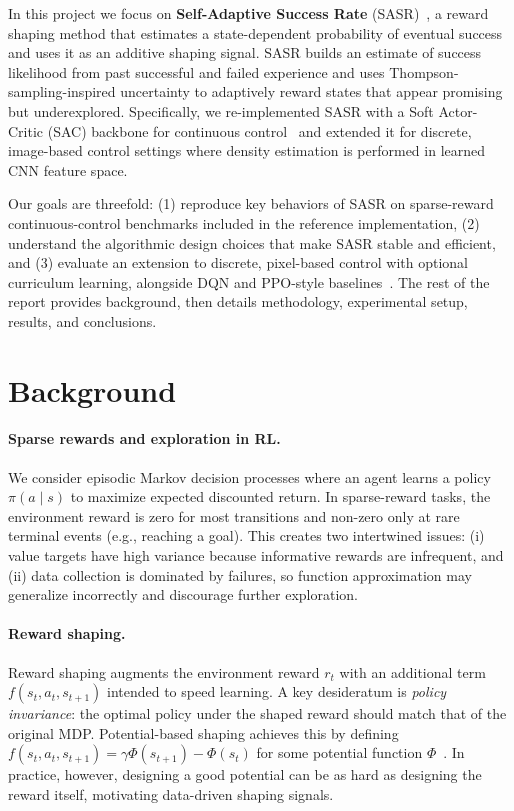 \documentclass{article}
\begin{document}
In this project we focus on \textbf{Self-Adaptive Success Rate} (SASR)~\citep{ma2025sasr}, a reward shaping method that estimates a state-dependent probability of eventual success and uses it as an additive shaping signal. SASR builds an estimate of success likelihood from past successful and failed experience and uses Thompson-sampling-inspired uncertainty to adaptively reward states that appear promising but underexplored. Specifically, we re-implemented SASR with a Soft Actor-Critic (SAC) backbone for continuous control~\citep{haarnoja2018sac} and extended it for discrete, image-based control settings where density estimation is performed in learned CNN feature space.

Our goals are threefold: (1) reproduce key behaviors of SASR on sparse-reward continuous-control benchmarks included in the reference implementation, (2) understand the algorithmic design choices that make SASR stable and efficient, and (3) evaluate an extension to discrete, pixel-based control with optional curriculum learning, alongside DQN and PPO-style baselines~\citep{mnih2015dqn}. The rest of the report provides background, then details methodology, experimental setup, results, and conclusions.

\section{Background}
\label{sec:background}

\paragraph{Sparse rewards and exploration in RL.}
We consider episodic Markov decision processes where an agent learns a policy \(\pi(a \mid s)\) to maximize expected discounted return. In sparse-reward tasks, the environment reward is zero for most transitions and non-zero only at rare terminal events (e.g., reaching a goal). This creates two intertwined issues: (i) value targets have high variance because informative rewards are infrequent, and (ii) data collection is dominated by failures, so function approximation may generalize incorrectly and discourage further exploration.

\paragraph{Reward shaping.}
Reward shaping augments the environment reward \(r_t\) with an additional term \(f(s_t, a_t, s_{t+1})\) intended to speed learning. A key desideratum is \emph{policy invariance}: the optimal policy under the shaped reward should match that of the original MDP. Potential-based shaping achieves this by defining \(f(s_t, a_t, s_{t+1}) = \gamma \Phi(s_{t+1}) - \Phi(s_t)\) for some potential function \(\Phi\)~\citep{ng1999policy}. In practice, however, designing a good potential can be as hard as designing the reward itself, motivating data-driven shaping signals.
\end{document}
